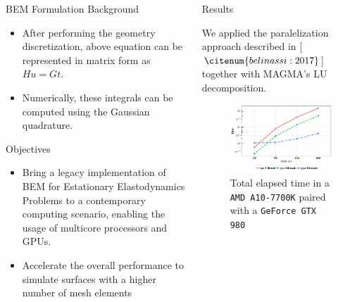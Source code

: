 \documentclass{beamer}
\begin{document}
\begin{frame}[fragile]
\begin{columns}[T]
\begin{column}{.46\textwidth}
\begin{block}{BEM Formulation Background}
\begin{itemize}
\item After performing the geometry discretization, above equation can be represented in matrix form as $Hu = Gt$.
\item Numerically, these integrals can be computed using the Gaussian quadrature.

\end{itemize}
\end{block}

\begin{block}{Objectives}\justifying
\begin{itemize}

\item Bring a legacy implementation of BEM for Estationary Elastodynamics Problems to a contemporary computing scenario, enabling the usage of multicore processors and GPUs.
\item Accelerate the overall performance to simulate surfaces with a higher number of mesh elements

\end{itemize}
\end{block}

\end{column}

\begin{column}{.46\textwidth}



\begin{block}{Results}

We applied the paralelization approach described in [$\citenum{belinassi:2017}$] together with MAGMA's LU decomposition. 

\begin{figure}
	\centering
	\includegraphics[scale=1.4]{venus_total.pdf}
	\caption{Total elapsed time in a \texttt{AMD A10-7700K} paired with a \texttt{GeForce GTX 980}}
	\label{fig:venus}
\end{figure}


\end{block}
\end{column}
\end{columns}
\end{frame}
\end{document}
